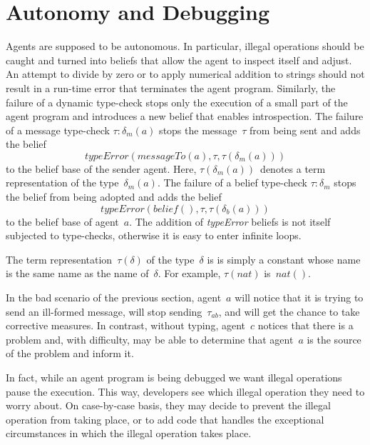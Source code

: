 \documentclass[preprint]{sigplanconf} %
\theoremstyle{remark}
\begin{document}
\section{Autonomy and Debugging} \label{sec:bugs} %

Agents are supposed to be autonomous. In particular, illegal operations
should be caught and turned into beliefs that allow the agent to inspect
itself and adjust. An attempt to divide by zero or to apply numerical
addition to strings should not result in a run-time error that terminates
the agent program. Similarly, the failure of a dynamic type-check stops
only the execution of a small part of the agent program and introduces a
new belief that enables introspection. The failure of a message type-check
$\tau:\delta_m(a)$ stops the message~$\tau$ from being sent and adds the
belief \[\mathit{typeError}(\mathit{messageTo}(a), \tau, \tau(\delta_m(a)))
\] to the belief base of the sender agent. Here,
$\tau(\delta_m(a))$~denotes a term representation of the
type~$\delta_m(a)$.  The failure of a belief type-check $\tau:\delta_m$
stops the belief from being adopted and adds the belief
\[\mathit{typeError}(\mathit{belief}(), \tau, \tau(\delta_b(a))) \] to the
belief base of agent~$a$. The addition of \textit{typeError} beliefs is not
itself subjected to type-checks, otherwise it is easy to enter infinite
loops.

The term representation~$\tau(\delta)$ of the type~$\delta$ is is simply a
constant whose name is the same name as the name of~$\delta$. For example,
$\tau(\mathit{nat})$ is~$\mathit{nat}()$.

In the bad scenario of the previous section, agent~$a$ will notice that it
is trying to send an ill-formed message, will stop sending~$\tau_{ab}$, and
will get the chance to take corrective measures. In contrast, without
typing, agent~$c$ notices that there is a problem and, with difficulty, may
be able to determine that agent~$a$ is the source of the problem and inform
it.

In fact, while an agent program is being debugged we want illegal
operations pause the execution. This way, developers see which illegal
operation they need to worry about. On case-by-case basis, they may decide
to prevent the illegal operation from taking place, or to add code that
handles the exceptional circumstances in which the illegal operation takes
place.

%
%
\end{document}
